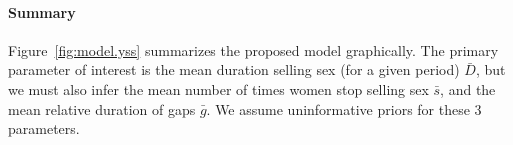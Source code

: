\paragraph{Summary}
Figure~\ref{fig:model.yss} summarizes the proposed model graphically.
The primary parameter of interest is
the mean duration selling sex (for a given period) $\bar{D}$,
but we must also infer
the mean number of times women stop selling sex $\bar{s}$, and
the mean relative duration of gaps $\bar{g}$.
We assume uninformative priors for these 3 parameters.

